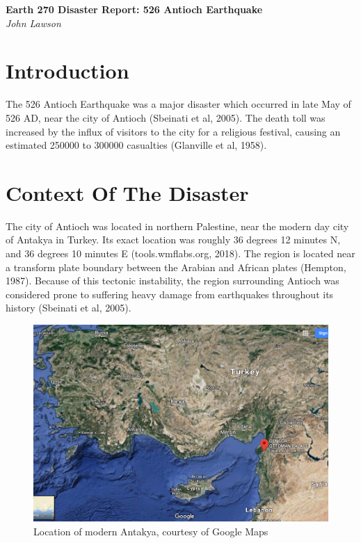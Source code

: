 \documentclass{article}
\begin{document}
\newpage
   \begin{center}
      \Large\textbf{Earth 270 Disaster Report: 526 Antioch Earthquake}\\
      \large\textit{John Lawson}
   \end{center}

\newpage

\section{Introduction}
 The 526 Antioch Earthquake was a major disaster which occurred in late May of
 526 AD, near the city of Antioch (Sbeinati et al, 2005). The death toll was 
 increased by the influx of visitors to the city for a religious festival, causing
 an estimated 250000 to 300000 casualties (Glanville et al, 1958).\\
 

\newpage 
\section{Context Of The Disaster}
 The city of Antioch was located in northern Palestine, near the modern day city
 of Antakya in Turkey. Its exact location was roughly 36 degrees 12 minutes N,
  and 36 degrees 10 minutes E (tools.wmflabs.org, 2018).
 The region is located near a transform plate boundary between the Arabian and
 African plates (Hempton, 1987). Because of this tectonic instability, the region
 surrounding Antioch was considered prone to suffering heavy damage from
 earthquakes throughout its history (Sbeinati et al, 2005). \\
 
 \begin{figure}[h]
	\includegraphics[width=\linewidth]{antiochMap.png}
	\caption{Location of modern Antakya, courtesy of Google Maps}
	\label{fig:antakyaMap}
 \end{figure}
\newpage
\end{document}
